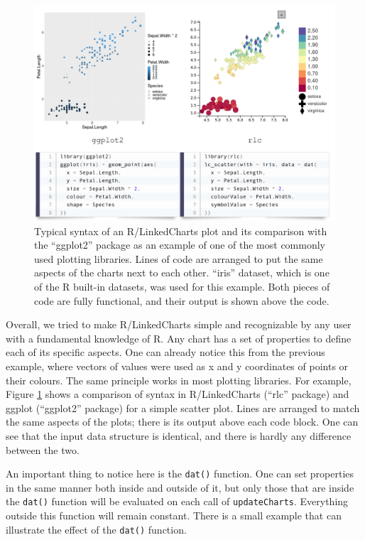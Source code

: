 \documentclass[twocolumn,10pt]{article}
\begin{document}
\begin{figure}
	\includegraphics[width=\textwidth]{FigB/figB.png}
	\caption{Typical syntax of an R/LinkedCharts plot and its comparison with the ``ggplot2'' \citep{wickham_2016} package as an example of one of the most commonly used plotting libraries. Lines of code are arranged to put the same aspects of the charts next to each other. ``iris'' dataset, which is one of the R built-in datasets, was used for this example. Both pieces of code are fully functional, and their output is shown above the code.}
	\label{FigB}
\end{figure}

Overall, we tried to make R/LinkedCharts simple and recognizable by any user with a fundamental knowledge of R. Any chart has a set of properties to define each of its specific aspects. One can already notice this from the previous example, where vectors of values were used as x and y coordinates of points or their colours. The same principle works in most plotting libraries. For example, Figure \ref{FigB} shows a comparison of syntax in R/LinkedCharts (``rlc'' package) and ggplot (``ggplot2'' \citep{wickham_2016} package) for a simple scatter plot. Lines are arranged to match the same aspects of the plots; there is its output above each code block. One can see that the input data structure is identical, and there is hardly any difference between the two.

An important thing to notice here is the \texttt{dat()} function. One can set properties in the same manner both inside and outside of it, but only those that are inside the \texttt{dat()} function will be evaluated on each call of \texttt{updateCharts}. Everything outside this function will remain constant. There is a small example that can illustrate the effect of the \texttt{dat()} function.
\end{document}
